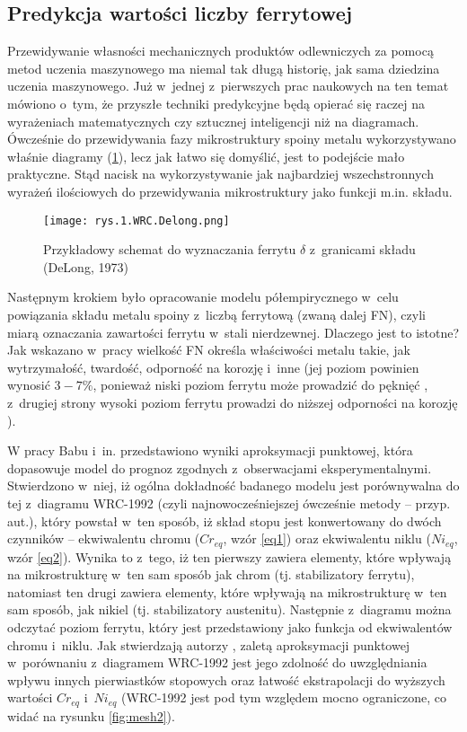 \subsection{Predykcja wartości liczby ferrytowej}
\label{sec:liczba.ferrytowa}

Przewidywanie własności mechanicznych produktów odlewniczych za pomocą metod uczenia maszynowego ma niemal tak długą historię, jak sama dziedzina uczenia maszynowego. Już w~jednej z~pierwszych prac naukowych na ten temat \cite{Olson85} mówiono o~tym, że przyszłe techniki predykcyjne będą opierać się raczej na wyrażeniach matematycznych czy sztucznej inteligencji niż na diagramach. 
Ówcześnie do przewidywania fazy mikrostruktury spoiny metalu wykorzystywano właśnie diagramy (\ref{fig:mesh1}), lecz jak łatwo się domyślić, jest to podejście mało praktyczne. Stąd nacisk na wykorzystywanie jak najbardziej wszechstronnych wyrażeń ilościowych do przewidywania mikrostruktury jako funkcji m.in. składu.

\begin{figure}[h]
    \centering
    \texttt{[image: rys.1.WRC.Delong.png]}
    \caption{Przykładowy schemat do wyznaczania ferrytu $ \delta $ z~granicami składu (DeLong, 1973)}
    \label{fig:mesh1}
\end{figure}

Następnym krokiem było opracowanie modelu półempirycznego w~celu powiązania składu metalu spoiny z~liczbą ferrytową (zwaną dalej FN), czyli miarą oznaczania zawartości ferrytu w~stali nierdzewnej. Dlaczego jest to istotne? Jak wskazano w~pracy \cite{Vitek03.I} wielkość FN określa właściwości metalu takie, jak wytrzymałość, twardość, odporność na korozję i~inne (jej poziom powinien wynosić $3-7\%$, ponieważ niski poziom ferrytu może prowadzić do pęknięć \cite{ferrite.meter, Saluja15}, z~drugiej strony wysoki poziom ferrytu prowadzi do niższej odporności na korozję \cite{Saluja15}). 

W pracy Babu i~in. \cite{Babu13} przedstawiono wyniki aproksymacji punktowej, która dopasowuje model do prognoz zgodnych z~obserwacjami eksperymentalnymi. Stwierdzono w~niej, iż ogólna dokładność badanego modelu jest porównywalna do tej z~diagramu WRC-1992 (czyli najnowocześniejszej ówcześnie metody – przyp. aut.), który powstał w~ten sposób, iż skład stopu jest konwertowany do dwóch czynników – ekwiwalentu chromu ($Cr_{eq}$, wzór \ref{eq1}) oraz ekwiwalentu niklu ($Ni_{eq}$, wzór \ref{eq2}). Wynika to z~tego, iż ten pierwszy zawiera elementy, które wpływają na mikrostrukturę w~ten sam sposób jak chrom (tj. stabilizatory ferrytu), natomiast ten drugi zawiera elementy, które wpływają na mikrostrukturę w~ten sam sposób, jak nikiel (tj. stabilizatory austenitu). Następnie z~diagramu można odczytać poziom ferrytu, który jest przedstawiony jako funkcja od ekwiwalentów chromu i~niklu. Jak stwierdzają autorzy \cite{Babu13}, zaletą aproksymacji punktowej w~porównaniu z~diagramem WRC-1992 jest jego zdolność do uwzględniania wpływu innych pierwiastków stopowych oraz łatwość ekstrapolacji do wyższych wartości $Cr_{eq}$ i~$Ni_{eq}$ (WRC-1992 jest pod tym względem mocno ograniczone, co widać na rysunku \ref{fig:mesh2}).

